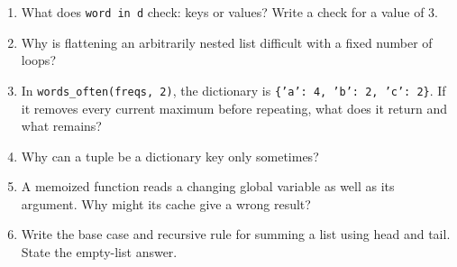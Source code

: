 \documentclass[11pt]{article}
\begin{document}
\begin{keepsection}
\begin{enumerate}
\item What does \texttt{word in d} check: keys or values? Write a check for a value of 3.
\item Why is flattening an arbitrarily nested list difficult with a fixed number of loops?
\item In \texttt{words\_often(freqs, 2)}, the dictionary is \texttt{\{'a': 4, 'b': 2, 'c': 2\}}. If it removes every current maximum before repeating, what does it return and what remains?
\item Why can a tuple be a dictionary key only sometimes?
\item A memoized function reads a changing global variable as well as its argument. Why might its cache give a wrong result?
\item Write the base case and recursive rule for summing a list using head and tail. State the empty-list answer.
\end{enumerate}

\end{keepsection}
\end{document}
